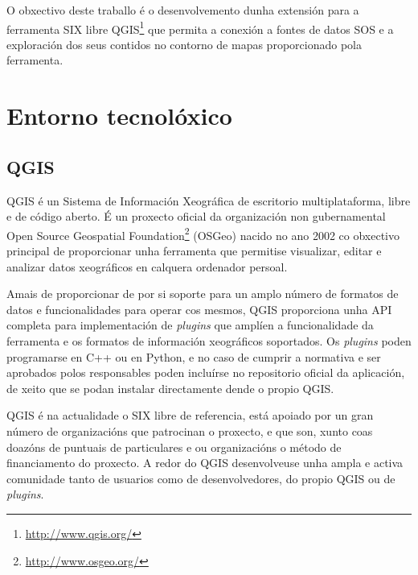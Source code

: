 O obxectivo deste traballo é o desenvolvemento dunha extensión para a ferramenta SIX libre QGIS\footnote{\url{http://www.qgis.org/}} que permita a conexión a fontes de datos SOS e a exploración dos seus contidos no contorno de mapas proporcionado pola ferramenta.

\section{Entorno tecnolóxico}
\subsection{QGIS}
QGIS é un Sistema de Información Xeográfica de escritorio multiplataforma, libre e de código aberto. É un proxecto oficial da organización non gubernamental Open Source Geospatial Foundation\footnote{\url{http://www.osgeo.org/}} (OSGeo) nacido no ano 2002 co obxectivo principal de proporcionar unha ferramenta que permitise visualizar, editar e analizar datos xeográficos en calquera ordenador persoal.

Amais de proporcionar de por si soporte para un amplo número de formatos de datos e funcionalidades para operar cos mesmos, QGIS proporciona unha API completa para implementación de \emph{plugins} que amplíen a funcionalidade da ferramenta e os formatos de información xeográficos soportados. Os \emph{plugins} poden programarse en C++ ou en Python, e no caso de cumprir a normativa e ser aprobados polos responsables poden incluírse no repositorio oficial da aplicación, de xeito que se podan instalar directamente dende o propio QGIS.

QGIS é na actualidade o SIX libre de referencia, está apoiado por un gran número de organizacións que patrocinan o proxecto, e que son, xunto coas doazóns de puntuais de particulares e ou organizacións o método de financiamento do proxecto. A redor do QGIS desenvolveuse unha ampla e activa comunidade tanto de usuarios como de desenvolvedores, do propio QGIS ou de \emph{plugins}.


